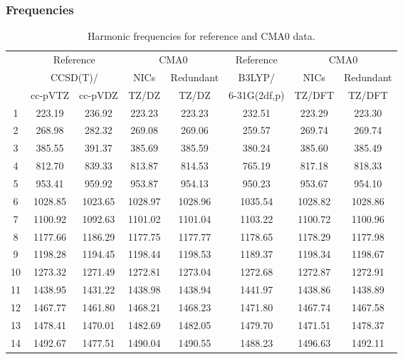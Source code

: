 \documentclass[10pt,oneside]{article}
\begin{document}
\begin{table}[h!]
\subsubsection*{Frequencies}
\centering
\caption{Harmonic frequencies for reference and CMA0 data.}
\begin{tabular}{cccccccc}
\toprule
{} & \multicolumn{2}{c}{Reference} & \multicolumn{2}{c}{CMA0} &    Reference & \multicolumn{2}{c}{CMA0} \\
{} & \multicolumn{2}{c}{CCSD(T)/} &    NICs &  Redundant &       B3LYP/ &    NICs & Redundant \\
{} &   cc-pVTZ & cc-pVDZ &   TZ/DZ &      TZ/DZ & 6-31G(2df,p) &  TZ/DFT &    TZ/DFT \\
\midrule
1  &    223.19 &  236.92 &  223.23 &     223.23 &       232.51 &  223.29 &    223.30 \\
2  &    268.98 &  282.32 &  269.08 &     269.06 &       259.57 &  269.74 &    269.74 \\
3  &    385.55 &  391.37 &  385.69 &     385.59 &       380.24 &  385.60 &    385.49 \\
4  &    812.70 &  839.33 &  813.87 &     814.53 &       765.19 &  817.18 &    818.33 \\
5  &    953.41 &  959.92 &  953.87 &     954.13 &       950.23 &  953.67 &    954.10 \\
6  &   1028.85 & 1023.65 & 1028.97 &    1028.96 &      1035.54 & 1028.82 &   1028.86 \\
7  &   1100.92 & 1092.63 & 1101.02 &    1101.04 &      1103.22 & 1100.72 &   1100.96 \\
8  &   1177.66 & 1186.29 & 1177.75 &    1177.77 &      1178.65 & 1178.29 &   1177.98 \\
9  &   1198.28 & 1194.45 & 1198.44 &    1198.53 &      1189.37 & 1198.34 &   1198.67 \\
10 &   1273.32 & 1271.49 & 1272.81 &    1273.04 &      1272.68 & 1272.87 &   1272.91 \\
11 &   1438.95 & 1431.22 & 1438.98 &    1438.94 &      1441.97 & 1438.86 &   1438.89 \\
12 &   1467.77 & 1461.80 & 1468.21 &    1468.23 &      1471.80 & 1467.74 &   1467.58 \\
13 &   1478.41 & 1470.01 & 1482.69 &    1482.05 &      1479.70 & 1471.51 &   1478.37 \\
14 &   1492.67 & 1477.51 & 1490.04 &    1490.55 &      1488.23 & 1496.63 &   1492.11 \\

\end{tabular}
\end{table}
\end{document}
